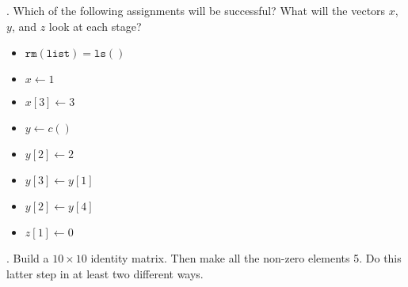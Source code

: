 \documentclass[a4paper, 12pt]{article}
\begin{document}
. Which of the following assignments will be successful? What will the vectors $x$, $y$, and $z$ look at each stage?
\begin{itemize}
\item{$\mathtt{rm(list) = ls()}$}
\item{$x \leftarrow 1$}
\item{$x[3] \leftarrow 3$}
\item{$y \leftarrow c()$}
\item{$y[2] \leftarrow 2$}
\item{$y[3] \leftarrow y[1]$}
\item{$y[2] \leftarrow y[4]$}
\item{$z[1] \leftarrow 0$}
\end{itemize}

. Build a $10 \times 10$ identity matrix. Then make all the non-zero elements 5. Do this latter step in at least two different ways.
\end{document}
